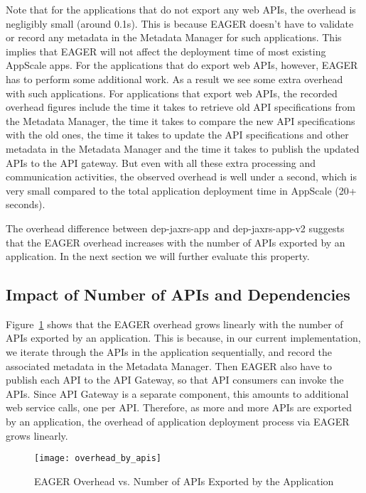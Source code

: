 Note that for the applications that do not export any web APIs, the overhead is negligibly small (around 0.1s). This is because EAGER
doesn't have to validate or record any metadata in the Metadata Manager for such applications. This implies that EAGER will not affect 
the deployment time of most existing AppScale apps. For the applications that do 
export web APIs, however, EAGER has to perform some additional work. As a result we see some extra overhead with such applications. 
For applications that export web APIs, the recorded overhead figures include the time it takes to retrieve old API specifications from the
Metadata Manager, the time it takes to compare the new API specifications with the old ones, the time it takes to update the API specifications
and other metadata in the Metadata Manager and the time it takes to publish the updated APIs to the API gateway.
But even with all these extra processing and communication activities, the observed overhead is well under a second,
which is very small compared to the total application deployment time in AppScale (20+ seconds).

The overhead difference between dep-jaxrs-app and dep-jaxrs-app-v2 suggests that the EAGER overhead increases with the number
of APIs exported by an application. In the next section we will further evaluate this property.

\subsection{Impact of Number of APIs and Dependencies}

Figure~\ref{fig:overhead_by_apis} shows that the EAGER overhead grows linearly with the number of APIs exported by an application.
This is because, in our current implementation, we iterate through the APIs in the application sequentially, and record the associated metadata in the
Metadata Manager. Then EAGER also have to publish each API to the API Gateway, so that API consumers can invoke the APIs. Since
API Gateway is a separate component, this amounts to additional web service calls, one per API. Therefore, as more and more APIs are exported 
by an application, the overhead of application deployment process via EAGER grows linearly. 

\begin{figure}
\centering
\texttt{[image: overhead\_by\_apis]}
\caption{EAGER Overhead vs. Number of APIs Exported by the Application}
\label{fig:overhead_by_apis}
\end{figure}

